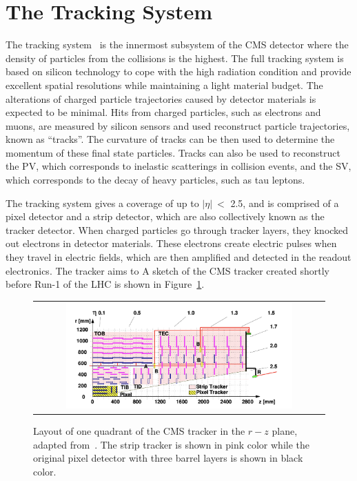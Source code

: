 \section{The Tracking System}
\label{sec:TK}

The tracking system~\cite{CMS:1997tlf} is the innermost subsystem of the \ac{CMS} detector where the density of particles from the collisions is the highest. The full tracking system is based on silicon technology to cope with the high radiation condition and provide excellent spatial resolutions while maintaining a light material budget. The alterations of charged particle trajectories caused by detector materials is expected to be minimal. Hits from charged particles, such as electrons and muons, are measured by silicon sensors and used reconstruct particle trajectories, known as ``tracks''.  The curvature of tracks can be then used to determine the momentum of these final state particles. Tracks can also be used to reconstruct the \ac{PV}, which corresponds to inelastic scatterings in collision events, and the \ac{SV}, which corresponds to the decay of heavy particles, such as tau leptons. 

The tracking system gives a coverage of up to $|\eta|~<$ 2.5, and is comprised of a pixel detector and a strip detector, which are also collectively known as the tracker detector. When charged particles go through tracker layers, they knocked out electrons in detector materials. These electrons create electric pulses when they travel in electric fields, which are then amplified and detected in the readout electronics. The tracker aims to A sketch of the \ac{CMS} tracker created shortly before Run-1 of the \ac{LHC} is shown in Figure~\ref{fig:Tracker}.

\begin{figure}[tbh!]
 \begin{center}
 \begin{tabular}{c}
 \includegraphics[width=0.8\textwidth]{figures/Part2/CMS/Tracker}
 \end{tabular}
 \caption{Layout of one quadrant of the \ac{CMS} tracker in the $r-z$ plane, adapted from~\cite{CMS:2009dvy}. The strip tracker is shown in pink color while the original pixel detector with three barrel layers is shown in black color.}
 \label{fig:Tracker}
 \end{center}
\end{figure}

